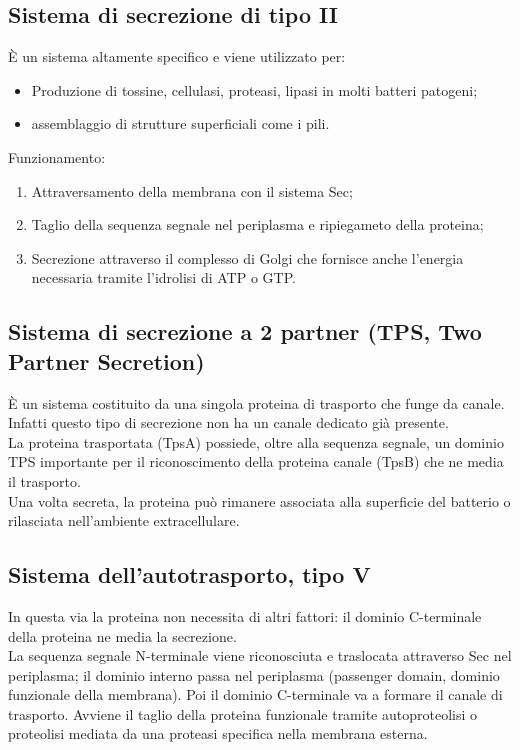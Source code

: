 \subsection{Sistema di secrezione di tipo II}
\`E un sistema altamente specifico e viene utilizzato per: 
\begin{itemize}
    \item Produzione di tossine, cellulasi, proteasi, lipasi in molti batteri patogeni; 
    \item assemblaggio di strutture superficiali come i pili.
\end{itemize}
Funzionamento:
\begin{enumerate}
    \item Attraversamento della membrana con il sistema Sec; 
    \item Taglio della sequenza segnale nel periplasma e ripiegameto della proteina;
    \item Secrezione attraverso il complesso di Golgi che fornisce anche l'energia necessaria tramite l'idrolisi di ATP o GTP.
\end{enumerate}
\subsection{Sistema di secrezione a 2 partner (TPS, Two Partner Secretion)}
\`E un sistema costituito da una singola proteina di trasporto che funge da canale. Infatti questo tipo di secrezione non ha un canale dedicato gi\`a presente.
\\La proteina trasportata (TpsA) possiede, oltre alla sequenza segnale, un dominio TPS importante per il riconoscimento della proteina canale (TpsB) che ne media il trasporto. 
\\Una volta secreta, la proteina pu\`o rimanere associata alla superficie del batterio o rilasciata nell'ambiente extracellulare. 
\subsection{Sistema dell'autotrasporto, tipo V}
In questa via la proteina non necessita di altri fattori: il dominio C-terminale della proteina ne media la secrezione. 
\\La sequenza segnale N-terminale viene riconosciuta e traslocata attraverso Sec nel periplasma; il dominio interno passa nel periplasma (passenger domain, dominio funzionale della membrana). Poi il dominio C-terminale va a formare il canale di trasporto. Avviene il taglio della proteina funzionale tramite autoproteolisi o proteolisi mediata da una proteasi specifica nella membrana esterna.
